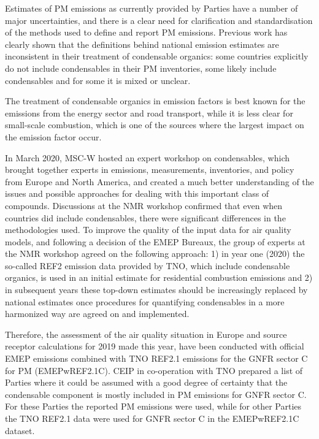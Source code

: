 Estimates of PM emissions as currently provided by Parties have a number of major uncertainties, and there is a clear need for clarification and standardisation of the methods used to define and report PM emissions. 
Previous work has clearly shown that the definitions behind national emission estimates are inconsistent in their treatment of condensable organics: some countries explicitly do not include condensables in their PM inventories, some likely include condensables and for some it is mixed or unclear.

The treatment of condensable organics in emission factors is best known for the emissions from the energy sector and road transport, while it is less clear for small-scale combustion, which is one of the sources where the largest impact on the emission factor occur.

In March 2020, MSC-W hosted an expert workshop on condensables, which brought together experts in emissions, measurements, inventories, and policy from Europe and North America, and created a much better understanding of the issues and
possible approaches for dealing with this important class of compounds.
Discussions at the NMR workshop confirmed that even when countries did include condensables, there were significant differences in the methodologies used.
To improve the quality of the input data for air quality models,  and following a decision of the EMEP Bureaux, the group of experts at the NMR workshop agreed on the following approach: 1) in year one (2020) the so-called REF2 emission data provided by TNO, which include condensable organics,  is used in an initial estimate for residential combustion emissions and 2) in subsequent years these top-down estimates should be increasingly replaced by national estimates once procedures for quantifying condensables in a more harmonized way are agreed on and implemented. 

Therefore, the assessment of the air quality situation in Europe and source receptor calculations for 2019 made this year, have been conducted with official EMEP emissions combined with TNO REF2.1 emissions for the GNFR sector C for PM (EMEPwREF2.1C). CEIP in co-operation with TNO prepared a list of Parties where it could be assumed with a good degree of certainty that the condensable component is mostly included in PM emissions for GNFR sector C. For these Parties the reported PM emissions were used, while for other Parties the TNO REF2.1 data were used for GNFR sector C in the EMEPwREF2.1C dataset.


